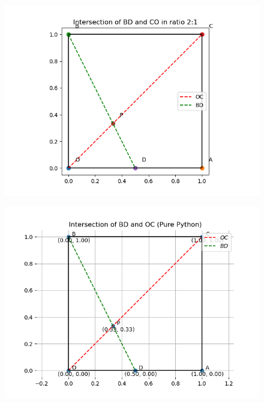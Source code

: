 \documentclass[journal]{IEEEtran}
\begin{document}
\begin{figure}[h]
    \centering
    \includegraphics[width=0.9\columnwidth]{figs/fig51.png}
    \caption{}
    \label{fig:placeholder}
\end{figure}

\begin{figure}
    \centering
    \includegraphics[width=0.9\columnwidth]{figs/fig52.png}
    \caption{}
    \label{fig:placeholder}
\end{figure}
\end{document}
